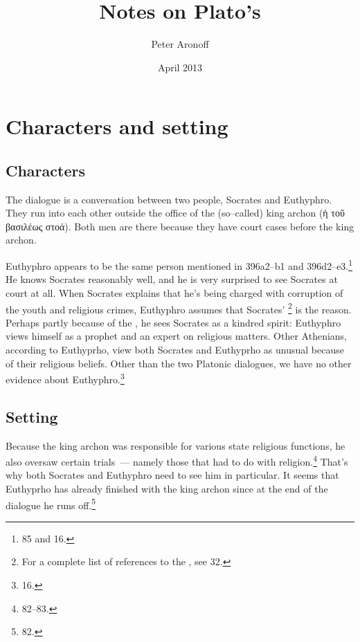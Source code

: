 \documentclass[11pt]{article}
\begin{document}
\begin{titlepage}
\title{Notes on Plato's }
\author{Peter Aronoff}
\date{April 2013}
\maketitle
\end{titlepage}

\section{Characters and setting}

\subsection{Characters}

The dialogue is a conversation between two people, Socrates and Euthyphro.
They run into each other outside the office of the (so--called) king archon
(ἡ τοῦ βασιλέως στοά).  Both men are there because they have court cases
before the king archon.

Euthyphro appears to be the same person mentioned in 
396a2--b1 and 396d2--e3.\footnote{\citet{burnet1924} 85 and
\citet{bailly2003} 16.}  He knows Socrates reasonably well, and he is very
surprised to see Socrates at court at all.  When Socrates explains that he's
being charged with corruption of the youth and religious crimes, Euthyphro
assumes that Socrates' \footnote{For a complete list of
references to the , see \citet{bailly2003} 32.}
is the reason.  Perhaps partly because of the , he sees
Socrates as a kindred spirit: Euthyphro views himself as a prophet and an
expert on religious matters.  Other Athenians, according to Euthyprho, view
both Socrates and Euthyprho as unusual because of their religious beliefs.
Other than the two Platonic dialogues, we have no other evidence about
Euthyphro.\footnote{\citet{bailly2003} 16.}

\subsection{Setting}

Because the king archon was responsible for various state religious
functions, he also oversaw certain trials~--- namely those that had to do
with religion.\footnote{\citet{burnet1924} 82--83.}  That's why both
Socrates and Euthyphro need to see him in particular.  It seems that
Euthyprho has already finished with the king archon since at the end of the
dialogue he runs off.\footnote{\citet{burnet1924} 82.}
\end{document}
